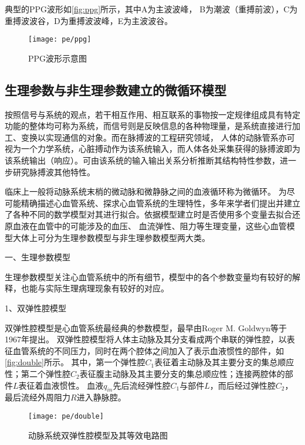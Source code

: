 典型的PPG波形如\autoref{fig:ppg}所示，其中A为主波波峰，
B为潮波（重搏前波），C为重搏波波谷，D为重搏波波峰，E为主波波谷。
\begin{figure}[htbp]
    \centering
    \texttt{[image: pe/ppg]} 
    \caption{\label{fig:ppg}PPG波形示意图}
\end{figure}

\subsection{生理参数与非生理参数建立的微循环模型}
按照信号与系统的观点，若干相互作用、相互联系的事物按一定规律组成具有特定功能的整体均可称为系统，而信号则是反映信息的各种物理量，是系统直接进行加工、变换以实现通信的对象\cite{Alan2019}。而在脉搏波的工程研究领域，
人体的动脉管系亦可视为一个力学系统，心脏搏动作为该系统输入，而人体各处采集获得的脉搏波即为该系统输出（响应）。可由该系统的输入输出关系分析推断其结构特性参数，进一步研究脉搏波其他特性\cite{PPGYY}。

临床上一般将动脉系统末梢的微动脉和微静脉之间的血液循环称为微循环\cite{Abraham2011,John2004}。
为尽可能精确描述心血管系统、探求心血管系统的生理特性，多年来学者们提出并建立了各种不同的数学模型对其进行拟合。依据模型建立时是否使用多个变量去拟合还原血液在血管中的可能涉及的血压、
血流弹性、阻力等生理变量，这些心血管模型大体上可分为生理参数模型与非生理参数模型两大类。

一、生理参数模型

生理参数模型关注心血管系统中的所有细节，模型中的各个参数变量均有较好的解释，也能与实际生理病理现象有较好的对应。

1、双弹性腔模型

双弹性腔模型是心血管系统最经典的参数模型，最早由Roger M. Goldwyn等\cite{Goldwyn1967}于1967年提出。
双弹性腔模型将人体主动脉及其分支看成两个串联的弹性腔，以表征血管系统的不同压力，同时在两个腔体之间加入了表示血液惯性的部件，如\autoref{fig:double}所示。
其中，第一个弹性腔$C_{1}$表征着主动脉及其主要分支的集总顺应性；第二个弹性腔$C_{2}$表征腹主动脉及其主要分支的集总顺应性；连接两腔体的部件$L$表征着血液惯性。
血液$q_{in}$先后流经弹性腔$C_{1}$与部件$L$，而后经过弹性腔$C_{2}$，最后流经外周阻力$R$进入静脉腔。
\begin{figure}[htbp]
    \centering
    \texttt{[image: pe/double]}
    \caption[动脉系统双弹性腔模型及其等效电路图]{\label{fig:double}动脉系统双弹性腔模型及其等效电路图\cite{PPGYY}}
\end{figure}

